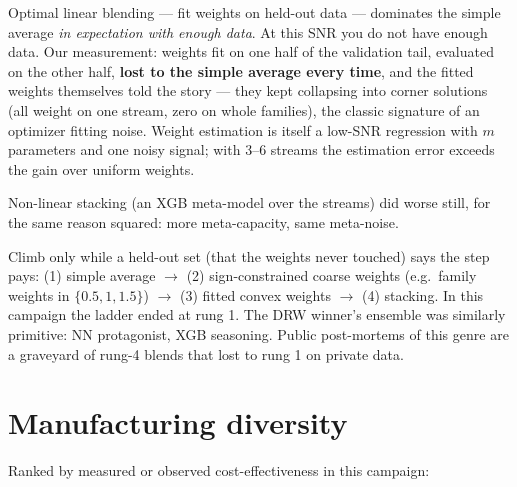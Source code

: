 Optimal linear blending --- fit weights on held-out data --- dominates the
simple average \emph{in expectation with enough data}. At this SNR you do
not have enough data. Our measurement: weights fit on one half of the
validation tail, evaluated on the other half, \textbf{lost to the simple
average every time}, and the fitted weights themselves told the story ---
they kept collapsing into corner solutions (all weight on one stream, zero
on whole families), the classic signature of an optimizer fitting noise.
Weight estimation is itself a low-SNR regression with $m$ parameters and
one noisy signal; with 3--6 streams the estimation error exceeds the gain
over uniform weights.

Non-linear stacking (an XGB meta-model over the streams) did worse still,
for the same reason squared: more meta-capacity, same meta-noise.

\begin{keybox}
Climb only while a held-out set (that the weights never touched) says the
step pays: (1) simple average $\to$ (2) sign-constrained coarse weights
(e.g.\ family weights in $\{0.5, 1, 1.5\}$) $\to$ (3) fitted convex
weights $\to$ (4) stacking. In this campaign the ladder ended at rung 1.
The DRW winner's ensemble was similarly primitive: NN protagonist, XGB
seasoning. Public post-mortems of this genre are a graveyard of rung-4
blends that lost to rung 1 on private data.
\end{keybox}

\section{Manufacturing diversity}

Ranked by measured or observed cost-effectiveness in this campaign:

